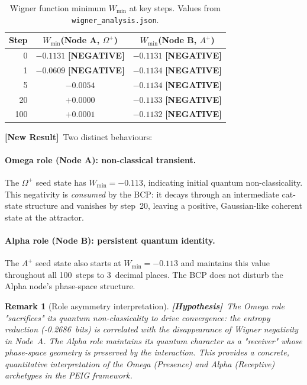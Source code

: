 \documentclass[12pt]{article}
\newtheorem{remark}{Remark}
\newcommand{\hypothesis}{\textbf{[Hypothesis]}}
\newcommand{\newresult}{\textbf{[New Result]}}
\begin{document}
\begin{table}[H]
\centering
\caption{Wigner function minimum $W_{\min}$ at key steps.
  Values from \texttt{wigner\_analysis.json}.}
\label{tab:wigner}
\begin{tabular}{rcc}
\toprule
\textbf{Step} & $W_{\min}$(Node A, $\Omega^+$) & $W_{\min}$(Node B, $A^+$)\\
\midrule
0   & $-0.1131$ \textbf{[NEGATIVE]} & $-0.1131$ \textbf{[NEGATIVE]}\\
1   & $-0.0609$ \textbf{[NEGATIVE]} & $-0.1134$ \textbf{[NEGATIVE]}\\
5   & $-0.0054$                     & $-0.1134$ \textbf{[NEGATIVE]}\\
20  & $+0.0000$                     & $-0.1133$ \textbf{[NEGATIVE]}\\
100 & $+0.0001$                     & $-0.1132$ \textbf{[NEGATIVE]}\\
\bottomrule
\end{tabular}
\end{table}

\newresult\ Two distinct behaviours:

\paragraph{Omega role (Node A): non-classical transient.}
The $\Omega^+$ seed state has $W_{\min}=-0.113$, indicating initial
quantum non-classicality.  This negativity is \emph{consumed} by the
BCP: it decays through an intermediate cat-state structure and vanishes
by step~20, leaving a positive, Gaussian-like coherent state at the attractor.

\paragraph{Alpha role (Node B): persistent quantum identity.}
The $A^+$ seed state also starts at $W_{\min}=-0.113$ and maintains this
value throughout all 100~steps to 3~decimal places.  The BCP does not
disturb the Alpha node's phase-space structure.

\begin{remark}[Role asymmetry interpretation]
\hypothesis\ The Omega role "sacrifices" its quantum non-classicality
to drive convergence: the entropy reduction (-0.2686~bits) is correlated
with the disappearance of Wigner negativity in Node~A.  The Alpha role
maintains its quantum character as a "receiver" whose phase-space
geometry is preserved by the interaction.  This provides a concrete,
quantitative interpretation of the Omega (Presence) and Alpha (Receptive)
archetypes in the PEIG framework.
\end{remark}
\end{document}
